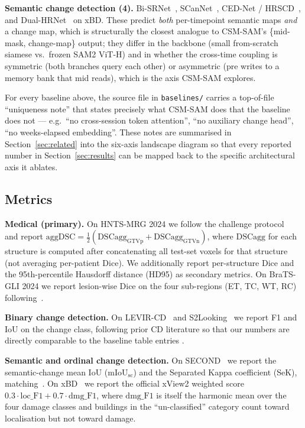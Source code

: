 \textbf{Semantic change detection (4).}
Bi-SRNet~\cite{ding2022bisrnet},
SCanNet~\cite{ding2024scannet},
CED-Net / HRSCD~\cite{daudt2019hrscd}, and
Dual-HRNet~\cite{koo2020dualhrnet} on xBD. These predict
\emph{both} per-timepoint semantic maps \emph{and} a change map,
which is structurally the closest analogue to CSM-SAM's
\{mid-mask, change-map\} output; they differ in the backbone (small
from-scratch siamese vs.\ frozen SAM2 ViT-H) and in whether the
cross-time coupling is symmetric (both branches query each other) or
asymmetric (pre writes to a memory bank that mid reads), which is the
axis CSM-SAM explores.

For every baseline above, the source file in \texttt{baselines/}
carries a top-of-file ``uniqueness note'' that states precisely what
CSM-SAM does that the baseline does not --- e.g.\ ``no cross-session
token attention'', ``no auxiliary change head'', ``no weeks-elapsed
embedding''. These notes are summarised in Section~\ref{sec:related}
into the six-axis landscape diagram so that every reported number in
Section~\ref{sec:results} can be mapped back to the specific
architectural axis it ablates.

\subsection{Metrics}
\label{sec:exp_metrics}

\textbf{Medical (primary).} On HNTS-MRG 2024 we follow the challenge
protocol~\cite{wahid2024hntsmrg} and report
$\mathrm{aggDSC} = \tfrac{1}{2}(\mathrm{DSCagg}_{\mathrm{GTVp}} +
\mathrm{DSCagg}_{\mathrm{GTVn}})$, where $\mathrm{DSCagg}$ for each
structure is computed after concatenating all test-set voxels for that
structure (not averaging per-patient Dice). We additionally report
per-structure Dice and the 95th-percentile Hausdorff distance (HD95)
as secondary metrics. On BraTS-GLI 2024 we report lesion-wise Dice on
the four sub-regions (ET, TC, WT, RC) following~\cite{delarosa2024brats}.

\textbf{Binary change detection.} On LEVIR-CD~\cite{chen2020levircd}
and S2Looking~\cite{shen2021s2looking} we report F1 and IoU on the
change class, following prior CD literature so that our numbers are
directly comparable to the baseline table entries
\cite{daudt2018fcsiam,fang2022snunet,chen2021bit,bandara2022changeformer}.

\textbf{Semantic and ordinal change detection.} On
SECOND~\cite{yang2021second} we report the semantic-change mean IoU
($\mathrm{mIoU}_{\mathrm{sc}}$) and the Separated Kappa coefficient
(SeK), matching~\cite{ding2022bisrnet,ding2024scannet}. On
xBD~\cite{gupta2019xbd} we report the official xView2 weighted score
$0.3 \cdot \mathrm{loc\_F1} + 0.7 \cdot \mathrm{dmg\_F1}$, where
$\mathrm{dmg\_F1}$ is itself the harmonic mean over the four damage
classes and buildings in the ``un-classified'' category count toward
localisation but not toward damage.

